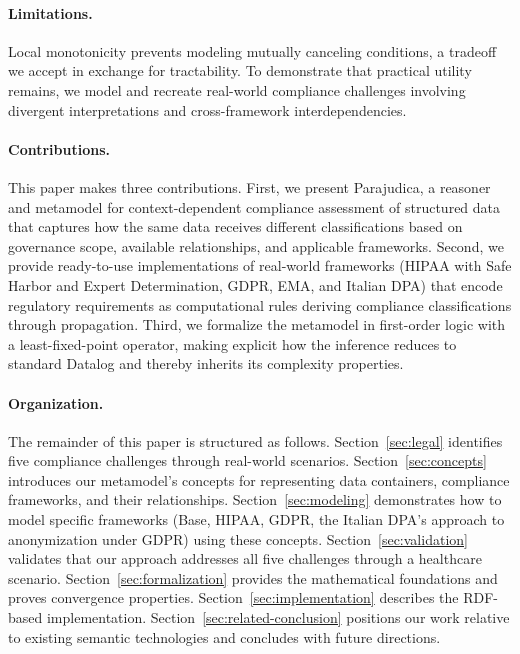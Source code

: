 \documentclass[runningheads,oneside]{llncs}
\begin{document}
\paragraph{Limitations.}
Local monotonicity prevents modeling mutually canceling conditions, a tradeoff we accept in exchange for tractability. To demonstrate that practical utility remains, we model and recreate real-world compliance challenges involving divergent interpretations and cross-framework interdependencies.

\paragraph{Contributions.}
This paper makes three contributions. First, we present Parajudica, a reasoner and metamodel for context-dependent compliance assessment of structured data that captures how the same data receives different classifications based on governance scope, available relationships, and applicable frameworks. Second, we provide ready-to-use implementations of real-world frameworks (HIPAA with Safe Harbor and Expert Determination, GDPR, EMA, and Italian DPA) that encode regulatory requirements as computational rules deriving compliance classifications through propagation. Third, we formalize the metamodel in first-order logic with a least-fixed-point operator, making explicit how the inference reduces to standard Datalog and thereby inherits its complexity properties.


\paragraph{Organization.}
The remainder of this paper is structured as follows. Section~\ref{sec:legal} identifies five compliance challenges through real-world scenarios. Section~\ref{sec:concepts} introduces our metamodel's concepts for representing data containers, compliance frameworks, and their relationships. Section~\ref{sec:modeling} demonstrates how to model specific frameworks (Base, HIPAA, GDPR, the Italian DPA's approach to anonymization under GDPR) using these concepts. Section~\ref{sec:validation} validates that our approach addresses all five challenges through a healthcare scenario. Section~\ref{sec:formalization} provides the mathematical foundations and proves convergence properties. Section~\ref{sec:implementation} describes the RDF-based implementation. Section~\ref{sec:related-conclusion} positions our work relative to existing semantic technologies and concludes with future directions.
\end{document}
